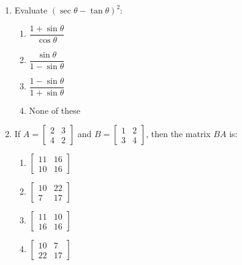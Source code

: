 \begin{enumerate}[label=(\roman*)]
    \item Evaluate $(\sec \theta - \tan \theta)^2$: 

        \begin{multicols}{2}
        \begin{enumerate}[label=(\alph*)]
            \item $\dfrac{1 + \sin \theta}{\cos \theta}$ 
            \item $\dfrac{\sin \theta}{1 - \sin \theta}$ 
            \item $\dfrac{1 - \sin \theta}{1 + \sin \theta}$ 
            \item None of these
        \end{enumerate}
        \end{multicols}

    \item If $A = \begin{bmatrix*} 2 & 3 \\ 4 & 2 \end{bmatrix*}$ and 
        $B = \begin{bmatrix*} 1 & 2 \\ 3 & 4 \end{bmatrix*}$, then the 
        matrix $BA$ is:

        \begin{multicols}{2}
        \begin{enumerate}[label=(\alph*)]
            \item $\begin{bmatrix*} 11 & 16 \\ 10 & 16 \end{bmatrix*}$ 
            \item $\begin{bmatrix*} 10 & 22 \\  7 & 17 \end{bmatrix*}$ 
            \item $\begin{bmatrix*} 11 & 10 \\ 16 & 16 \end{bmatrix*}$ 
            \item $\begin{bmatrix*} 10 &  7 \\ 22 & 17 \end{bmatrix*}$ 
        \end{enumerate}
        \end{multicols}


\end{enumerate}

